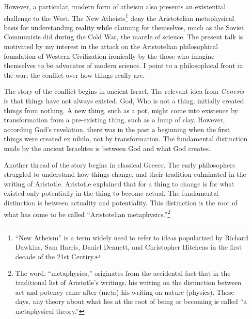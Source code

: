 \documentclass{article}
\begin{document}
However, a particular, modern form of atheism also presents an existential
challenge to the West.  The New Atheists\footnote{%
   ``New Atheism'' is a term widely used to refer to ideas popularized by
   Richard Dawkins, Sam Harris, Daniel Dennett, and Christopher Hitchens in the
   first decade of the 21st Centiry.
}
deny the Aristotelian metaphysical basis for understanding reality while
claiming for themselves, much as the Soviet Communists did during the Cold War,
the mantle of science.  The present talk is motivated by my interest in the
attack on the Aristotelian philosophical foundation of Western Civilization
ironically by the those who imagine themselves to be advocates of modern
science.  I point to a philosophical front in the war: the conflict over how
things really are.

The story of the conflict begins in ancient Israel.  The relevant idea from
{\it Genesis} is that things have not always existed.  God, Who is not a thing,
initially created things from nothing.  A new thing, such as a pot, might come
into existence by transformation from a pre-existing thing, such as a lump of
clay.  However, according God's revelation, there was in the past a beginning
when the first things were created ex nihilo, not by transformation.  The
fundamental distinction made by the ancient Israelites is between God and what
God creates.

Another thread of the story begins in classical Greece.  The early philosophers
struggled to understand how things change, and their tradition culminated in
the writing of Aristotle.  Aristotle explained that for a thing to change is
for what existed only potentially in the thing to become actual.  The
fundamental distinction is between actuality and potentiality.  This
distinction is the root of what has come to be called ``Aristotelian
metaphysics.''\footnote{%
   The word, ``metaphysics,'' originates from the accidental fact that in the
   traditional list of Aristotle's writings, his writing on the distinction
   between act and potency came after (meta) his writing on nature (physics).
   These days, any theory about what lies at the root of being or becoming is
   called ``a metaphysical theory.''%
}
\end{document}
